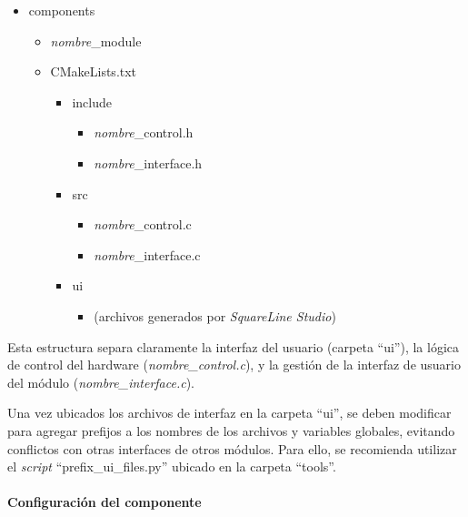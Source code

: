 \begin{itemize}[noitemsep]
    \item components
    \begin{itemize}[noitemsep]
        \item \textit{nombre}\_module
        \item CMakeLists.txt
        \begin{itemize}[noitemsep]
            \item include
            \begin{itemize}[noitemsep]
                \item \textit{nombre}\_control.h
                \item \textit{nombre}\_interface.h
            \end{itemize}
            \item src
            \begin{itemize}[noitemsep]
                \item \textit{nombre}\_control.c
                \item \textit{nombre}\_interface.c
            \end{itemize}
            \item ui
            \begin{itemize}[noitemsep]
                \item (archivos generados por \textit{SquareLine Studio})
            \end{itemize}
        \end{itemize} 
    \end{itemize}   
\end{itemize}

Esta estructura separa claramente la interfaz del usuario (carpeta ``ui''), la lógica de control del hardware (\textit{nombre\_control.c}), y la gestión de la interfaz de usuario del módulo (\textit{nombre\_interface.c}).

Una vez ubicados los archivos de interfaz en la carpeta ``ui'', se deben modificar para agregar prefijos a los nombres de los archivos y variables globales, evitando conflictos con otras interfaces de otros módulos. Para ello, se recomienda utilizar el \textit{script} ``prefix\_ui\_files.py'' ubicado en la carpeta ``tools''.

\paragraph{Configuración del componente}

